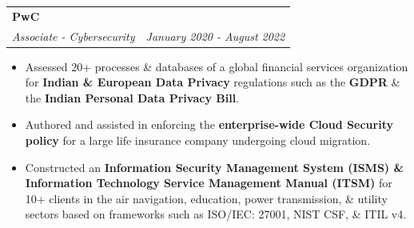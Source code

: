 \documentclass[letterpaper,11pt]{article}
\makeatletter
\newcommand{\resumeItem}[1]{
  \item\small{
    {#1 \vspace{-2pt}}
  }
}
\newcommand{\resumeSubheading}[4]{
  \vspace{-2pt}\item
    \begin{tabular*}{0.97\textwidth}[t]{l@{\extracolsep{\fill}}r}
      \textbf{#1} & #2 \\
      \textit{\small#3} & \textit{\small #4} \\
    \end{tabular*}\vspace{0pt}
}
\newcommand{\resumeItemListStart}{\begin{itemize}}
\newcommand{\resumeItemListEnd}{\end{itemize}\vspace{-5pt}}
\makeatother
\begin{document}
\resumeSubheading
      {PwC}{}
      {Associate - Cybersecurity}{January 2020 - August 2022}
      \resumeItemListStart
       \resumeItem{}
       {Assessed 20+ processes \& databases of a global financial services organization for \textbf{Indian \& European Data Privacy} regulations such as the \textbf{GDPR} \& the \textbf{Indian Personal Data Privacy Bill}.}
        \resumeItem{}
        {Authored and assisted in enforcing the \textbf{enterprise-wide Cloud Security policy} for a large life insurance company undergoing cloud migration.}
        \resumeItem{}
        {Constructed an \textbf{Information Security Management System (ISMS) \& Information Technology Service Management Manual (ITSM)} for 10+ clients in the air navigation, education, power transmission, \& utility sectors based on frameworks such as ISO/IEC: 27001, NIST CSF, \& ITIL v4.}
        
      \resumeItemListEnd
\end{document}

